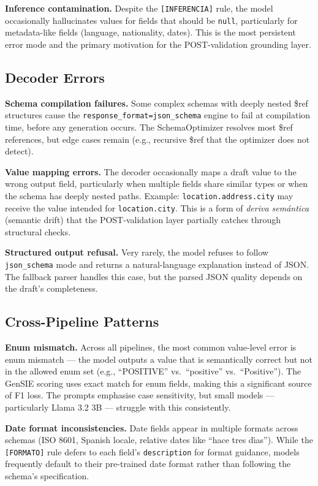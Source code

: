 \documentclass{ceurart}
\begin{document}
\textbf{Inference contamination.}
Despite the \texttt{[INFERENCIA]} rule, the model occasionally hallucinates values for
fields that should be \texttt{null}, particularly for metadata-like fields (language,
nationality, dates).
This is the most persistent error mode and the primary motivation for the
POST-validation grounding layer.

\subsection{Decoder Errors}

\textbf{Schema compilation failures.}
Some complex schemas with deeply nested \$ref structures cause the
\texttt{response\_format=json\_schema} engine to fail at compilation time, before any
generation occurs.
The SchemaOptimizer resolves most \$ref references, but edge cases remain (e.g.,
recursive \$ref that the optimizer does not detect).

\textbf{Value mapping errors.}
The decoder occasionally maps a draft value to the wrong output field, particularly
when multiple fields share similar types or when the schema has deeply nested paths.
Example: \texttt{location.address.city} may receive the value intended for
\texttt{location.city}.
This is a form of \emph{deriva sem\'{a}ntica} (semantic drift) that the
POST-validation layer partially catches through structural checks.

\textbf{Structured output refusal.}
Very rarely, the model refuses to follow \texttt{json\_schema} mode and returns a
natural-language explanation instead of JSON.
The fallback parser handles this case, but the parsed JSON quality depends on the
draft's completeness.

\subsection{Cross-Pipeline Patterns}

\textbf{Enum mismatch.}
Across all pipelines, the most common value-level error is enum mismatch --- the model
outputs a value that is semantically correct but not in the allowed enum set
(e.g., ``POSITIVE'' vs.\ ``positive'' vs.\ ``Positive'').
The GenSIE scoring uses exact match for enum fields, making this a significant source
of F1 loss.
The prompts emphasise case sensitivity, but small models --- particularly
Llama 3.2 3B --- struggle with this consistently.

\textbf{Date format inconsistencies.}
Date fields appear in multiple formats across schemas (ISO 8601, Spanish locale,
relative dates like ``hace tres d\'{\i}as'').
While the \texttt{[FORMATO]} rule defers to each field's \texttt{description} for
format guidance, models frequently default to their pre-trained date format rather
than following the schema's specification.
\end{document}
